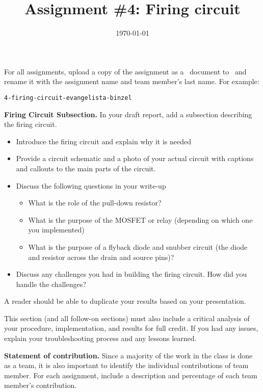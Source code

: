\documentclass[noanswers]{exam}
\title{Assignment \#4: Firing circuit}
\author{\usnaAuthorShort}
\date{\today}
\begin{document}
\maketitle

For all assignments, upload a copy of the assignment as a \Google\ document to \GoogleClassroom\ and rename it with the assignment name and team member’s last name.  For example:
\begin{lstlisting}
4-firing-circuit-evangelista-binzel
\end{lstlisting}



\begin{questions}
\question
\textbf{Firing Circuit Subsection.} In your draft report, add a subsection describing the firing circuit. 
\begin{itemize}
\item Introduce the firing circuit and explain why it is needed
\item Provide a circuit schematic and a photo of your actual circuit with captions and callouts to the main parts of the circuit.
\item Discuss the following questions in your write-up
\begin{itemize}
\item What is the role of the pull-down resistor?
\item What is the purpose of the MOSFET or relay (depending on which one you implemented)
\item What is the purpose of a flyback diode and snubber circuit (the diode and resistor across the drain and source pins)?
\end{itemize}
\item Discuss any challenges you had in building the firing circuit.  How did you handle the challenges?
\end{itemize}

A reader should be able to duplicate your results based on your presentation.

This section (and all follow-on sections) must also include a critical analysis of your procedure, implementation, and results for full credit.  If you had any issues, explain your troubleshooting process and any lessons learned.

\question
\textbf{Statement of contribution.} Since a majority of the work in the class is done as a team, it is also important to identify the individual contributions of team member.  For each assignment, include a description and percentage of each team member’s contribution. 
\end{questions}
\end{document}
